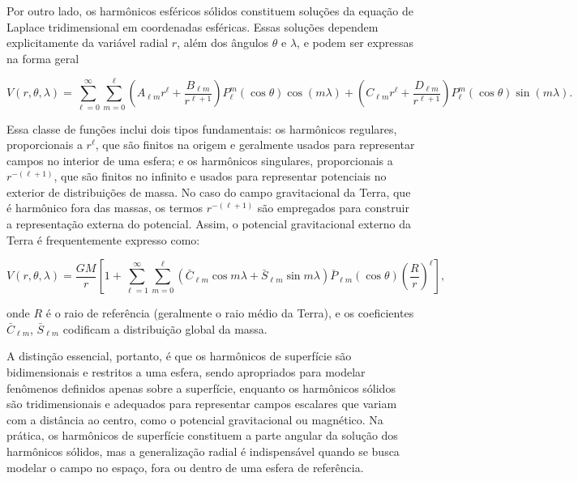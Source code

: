 Por outro lado, os harmônicos esféricos sólidos constituem soluções da equação de Laplace tridimensional em coordenadas esféricas. Essas soluções dependem explicitamente da variável radial \( r \), além dos ângulos \( \theta \) e \( \lambda \), e podem ser expressas na forma geral

\[
V(r, \theta, \lambda) = \sum_{\ell=0}^\infty \sum_{m=0}^\ell \left( A_{\ell m} r^\ell + \frac{B_{\ell m}}{r^{\ell+1}} \right) P_\ell^m(\cos\theta) \cos(m\lambda) + \left( C_{\ell m} r^\ell + \frac{D_{\ell m}}{r^{\ell+1}} \right) P_\ell^m(\cos\theta) \sin(m\lambda) \text{.}
\]

\noindent
Essa classe de funções inclui dois tipos fundamentais: os harmônicos regulares, proporcionais a \( r^\ell \), que são finitos na origem e geralmente usados para representar campos no interior de uma esfera; e os harmônicos singulares, proporcionais a \( r^{-(\ell+1)} \), que são finitos no infinito e usados para representar potenciais no exterior de distribuições de massa. No caso do campo gravitacional da Terra, que é harmônico fora das massas, os termos \( r^{-(\ell+1)} \) são empregados para construir a representação externa do potencial. Assim, o potencial gravitacional externo da Terra é frequentemente expresso como:

\[
V(r, \theta, \lambda) = \frac{GM}{r} \left[ 1 + \sum_{\ell=1}^\infty \sum_{m=0}^\ell \left( \bar{C}_{\ell m} \cos m\lambda + \bar{S}_{\ell m} \sin m\lambda \right) \bar{P}_{\ell m}(\cos\theta) \left( \frac{R}{r} \right)^\ell \right] \text{,}
\]

\noindent
onde \( R \) é o raio de referência (geralmente o raio médio da Terra), e os coeficientes \( \bar{C}_{\ell m} \), \( \bar{S}_{\ell m} \) codificam a distribuição global da massa.

A distinção essencial, portanto, é que os harmônicos de superfície são bidimensionais e restritos a uma esfera, sendo apropriados para modelar fenômenos definidos apenas sobre a superfície, enquanto os harmônicos sólidos são tridimensionais e adequados para representar campos escalares que variam com a distância ao centro, como o potencial gravitacional ou magnético. Na prática, os harmônicos de superfície constituem a parte angular da solução dos harmônicos sólidos, mas a generalização radial é indispensável quando se busca modelar o campo no espaço, fora ou dentro de uma esfera de referência.


